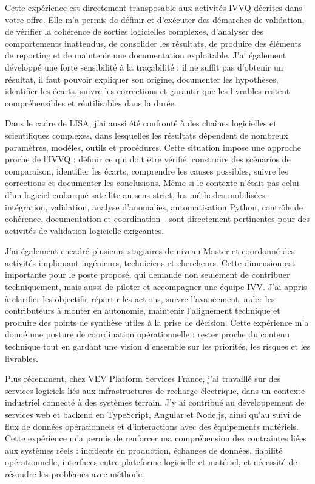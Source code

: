 \documentclass[11pt,a4paper]{../_shared/altacv}
\begin{document}
{Cette expérience est directement transposable aux activités IVVQ décrites dans votre offre. Elle m'a permis de définir et d'exécuter des démarches de validation, de vérifier la cohérence de sorties logicielles complexes, d'analyser des comportements inattendus, de consolider les résultats, de produire des éléments de reporting et de maintenir une documentation exploitable. J'ai également développé une forte sensibilité à la traçabilité : il ne suffit pas d'obtenir un résultat, il faut pouvoir expliquer son origine, documenter les hypothèses, identifier les écarts, suivre les corrections et garantir que les livrables restent compréhensibles et réutilisables dans la durée.

Dans le cadre de LISA, j'ai aussi été confronté à des chaînes logicielles et scientifiques complexes, dans lesquelles les résultats dépendent de nombreux paramètres, modèles, outils et procédures. Cette situation impose une approche proche de l'IVVQ : définir ce qui doit être vérifié, construire des scénarios de comparaison, identifier les écarts, comprendre les causes possibles, suivre les corrections et documenter les conclusions. Même si le contexte n'était pas celui d'un logiciel embarqué satellite au sens strict, les méthodes mobilisées - intégration, validation, analyse d'anomalies, automatisation Python, contrôle de cohérence, documentation et coordination - sont directement pertinentes pour des activités de validation logicielle exigeantes.

J'ai également encadré plusieurs stagiaires de niveau Master et coordonné des activités impliquant ingénieurs, techniciens et chercheurs. Cette dimension est importante pour le poste proposé, qui demande non seulement de contribuer techniquement, mais aussi de piloter et accompagner une équipe IVV. J'ai appris à clarifier les objectifs, répartir les actions, suivre l'avancement, aider les contributeurs à monter en autonomie, maintenir l'alignement technique et produire des points de synthèse utiles à la prise de décision. Cette expérience m'a donné une posture de coordination opérationnelle : rester proche du contenu technique tout en gardant une vision d'ensemble sur les priorités, les risques et les livrables.

Plus récemment, chez VEV Platform Services France, j'ai travaillé sur des services logiciels liés aux infrastructures de recharge électrique, dans un contexte industriel connecté à des systèmes terrain. J'y ai contribué au développement de services web et backend en TypeScript, Angular et Node.js, ainsi qu'au suivi de flux de données opérationnels et d'interactions avec des équipements matériels. Cette expérience m'a permis de renforcer ma compréhension des contraintes liées aux systèmes réels : incidents en production, échanges de données, fiabilité opérationnelle, interfaces entre plateforme logicielle et matériel, et nécessité de résoudre les problèmes avec méthode.

}
\end{document}
